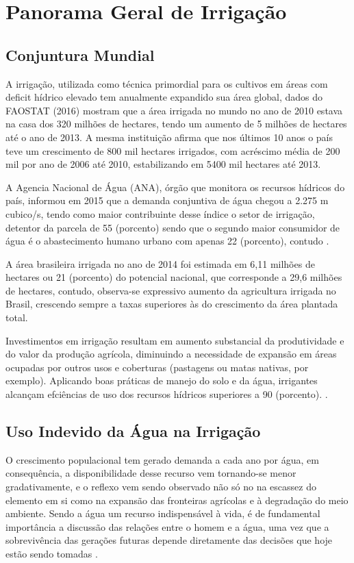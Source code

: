 \chapter{Panorama Geral de Irrigação}
\label{CAP2}



\section{Conjuntura Mundial}\label{Sub:equa}

A irrigação, utilizada como técnica primordial para os cultivos em áreas com deficit hídrico elevado tem anualmente expandido sua área global, dados do FAOSTAT (2016) mostram que a área irrigada no mundo no ano de 2010 estava na casa dos 320 milhões de hectares, tendo um aumento de 5 milhões de hectares até o ano de 2013.
A mesma instituição afirma que nos últimos 10 anos o país teve um crescimento de 800 mil hectares irrigados, com acréscimo média de 200 mil por ano de 2006 até 2010, estabilizando em 5400 mil hectares até 2013.  

A Agencia Nacional de Água (ANA), órgão que monitora os recursos hídricos do país, informou em 2015 que a demanda conjuntiva de água chegou a 2.275 m cubico/s, tendo como maior contribuinte desse índice o setor de irrigação, detentor da parcela de 55 (porcento) sendo que o segundo maior consumidor de água é o abastecimento humano urbano com apenas 22 (porcento), contudo .

A área brasileira irrigada no ano de 2014 foi estimada em 6,11 milhões de hectares  ou 21 (porcento) do potencial nacional, que corresponde a 29,6 milhões de hectares, contudo, observa-se expressivo aumento da agricultura irrigada no Brasil, crescendo sempre a taxas superiores às do crescimento da área plantada total.

Investimentos em irrigação resultam em aumento substancial da produtividade e do valor da produção agrícola, diminuindo a necessidade de expansão em áreas ocupadas por outros usos e coberturas (pastagens ou matas nativas, por exemplo). Aplicando boas práticas de manejo do solo e da água, irrigantes alcançam efciências de uso dos recursos hídricos superiores a 90 (porcento). \cite{ana2015}.

\section{Uso Indevido da Água na Irrigação}
O crescimento populacional tem gerado demanda a cada ano por água, em consequência, a disponibilidade desse recurso vem tornando-se menor gradativamente, e o reflexo vem sendo observado não só no na escassez do elemento em si como na expansão das fronteiras agrícolas e à degradação do meio ambiente. Sendo a água um recurso indispensável à vida, é de fundamental importância a discussão das relações entre o homem e a água, uma vez que a sobrevivência das gerações futuras depende diretamente das decisões que hoje estão sendo tomadas \cite{lima1999uso}.

